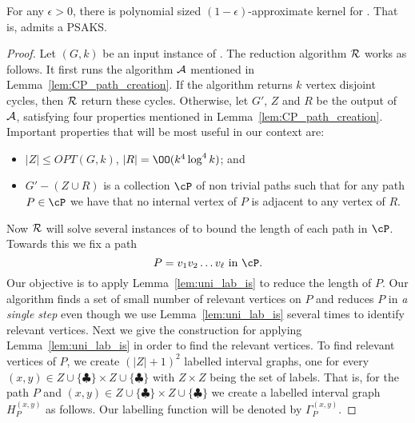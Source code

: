 \begin{theorem}
\label{thm:CPapprx}
For any $\epsilon>0$, there is polynomial sized $(1-\epsilon)$-approximate kernel for \CP. That is, \CP{} admits a PSAKS. 
\end{theorem}
\begin{proof}
Let $(G,k)$ be an input instance of \CP.  
The reduction algorithm ${\cal R}$ works as follows. It first runs the algorithm ${\cal A}$ mentioned in Lemma~\ref{lem:CP_path_creation}. If the algorithm returns $k$ vertex disjoint cycles, then ${\cal R}$ return these cycles. Otherwise, let $G'$, $Z$ and $R$ be the output of ${\cal A}$, satisfying four properties mentioned in Lemma~\ref{lem:CP_path_creation}. Important properties that will be most useful in our context are: 


\begin{itemize}
\setlength{\itemsep}{-2pt}
\item $\vert Z \vert \leq OPT(G,k)$, $\vert R\vert = \OO(k^4\log^4 k)$; and 
\item  $G'-(Z\cup R)$ is a collection $\cP$ of non trivial  
paths such that for any path $P\in \cP$ we have that no internal vertex of $P$ is adjacent to  
any vertex of $R$.
\end{itemize}
\noindent 
Now ${\cal R}$ will solve several instances of  \shortULI{$\epsilon$} to bound the length of each path in 
$\cP$. Towards this we fix a path $$P=v_1v_2\ldots v_{\ell}  \mbox{ in }  
\cP.$$ 
Our objective is to apply Lemma~\ref{lem:uni_lab_is} 
to reduce the length of $P$. 
Our algorithm finds a set of small number of relevant vertices on $P$ 
and reduces $P$ in {\em a single step} even though 
we use Lemma~\ref{lem:uni_lab_is} several times to identify relevant vertices.  Next we give the  construction for applying Lemma~\ref{lem:uni_lab_is} in order to find the relevant vertices. To find relevant vertices of $P$, we create $(\vert Z \vert +1)^2$ labelled interval graphs, one for every 
$(x,y)\in Z\cup \{\clubsuit\} \times Z \cup \{\clubsuit\}$  
with $Z\times Z$ being the set of labels. That is, for  the path $P$ and $(x,y)\in Z\cup \{\clubsuit\} \times Z \cup \{\clubsuit\}$ we create a  labelled interval graph $H_P^{(x,y)}$ as follows. Our labelling function will be denoted by  $\Gamma_P^{(x,y)}$.


\end{proof}
